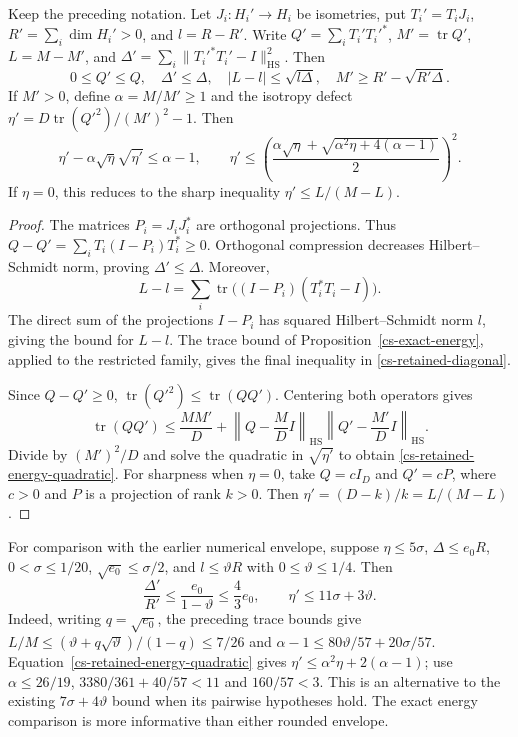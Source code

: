 \begin{proposition}
\label{cs-retained-energy}
Keep the preceding notation. Let $J_i:H_i'\to H_i$ be isometries,
put $T_i'=T_iJ_i$, $R'=\sum_i\dim H_i'>0$, and $l=R-R'$.
Write $Q'=\sum_iT_i'T_i'^*$, $M'=\operatorname{tr}Q'$,
$L=M-M'$, and $\Delta'=\sum_i\|T_i'^*T_i'-I\|_{\mathrm{HS}}^2$.
Then
\begin{equation}\label{cs-retained-diagonal}
 0\le Q'\le Q,\quad
 \Delta'\le\Delta,\quad |L-l|\le\sqrt{l\Delta},\quad
 M'\ge R'-\sqrt{R'\Delta}.
\end{equation}
If $M'>0$, define $\alpha=M/M'\ge1$ and the isotropy defect
$\eta'=D\operatorname{tr}(Q'^2)/(M')^2-1$. Then
\begin{equation}\label{cs-retained-energy-quadratic}
 \eta'-\alpha\sqrt\eta\sqrt{\eta'}\le\alpha-1,
 \qquad
 \eta'\le
 \left(\frac{\alpha\sqrt\eta+
       \sqrt{\alpha^2\eta+4(\alpha-1)}}2\right)^2.
\end{equation}
If $\eta=0$, this reduces to the sharp inequality
$\eta'\le L/(M-L)$.
\end{proposition}
\begin{proof}
The matrices $P_i=J_iJ_i^*$ are orthogonal projections. Thus
$Q-Q'=\sum_iT_i(I-P_i)T_i^*\ge0$.
Orthogonal compression decreases Hilbert--Schmidt norm, proving
$\Delta'\le\Delta$. Moreover,
\[
 L-l=\sum_i\operatorname{tr}\bigl((I-P_i)(T_i^*T_i-I)\bigr).
\]
The direct sum of the projections $I-P_i$ has squared
Hilbert--Schmidt norm $l$, giving the bound for $L-l$.
The trace bound of Proposition~\ref{cs-exact-energy}, applied to
the restricted family, gives the final inequality in
\eqref{cs-retained-diagonal}.

Since $Q-Q'\ge0$,
$\operatorname{tr}(Q'^2)\le\operatorname{tr}(QQ')$.
Centering both operators gives
\[
 \operatorname{tr}(QQ')\le\frac{MM'}D+
 \left\|Q-\frac MD I\right\|_{\mathrm{HS}}
 \left\|Q'-\frac{M'}D I\right\|_{\mathrm{HS}}.
\]
Divide by $(M')^2/D$ and solve the quadratic in
$\sqrt{\eta'}$ to obtain \eqref{cs-retained-energy-quadratic}.
For sharpness when $\eta=0$, take $Q=cI_D$ and $Q'=cP$,
where $c>0$ and $P$ is a projection of rank $k>0$.
Then $\eta'=(D-k)/k=L/(M-L)$.
\end{proof}

For comparison with the earlier numerical envelope, suppose
$\eta\le5\sigma$, $\Delta\le e_0R$,
$0<\sigma\le1/20$, $\sqrt{e_0}\le\sigma/2$, and
$l\le\vartheta R$ with $0\le\vartheta\le1/4$.
Then
\[
 \frac{\Delta'}{R'}\le\frac{e_0}{1-\vartheta}\le\frac43e_0,
 \qquad \eta'\le11\sigma+3\vartheta.
\]
Indeed, writing $q=\sqrt{e_0}$, the preceding trace bounds give
$L/M\le(\vartheta+q\sqrt\vartheta)/(1-q)\le7/26$ and
$\alpha-1\le80\vartheta/57+20\sigma/57$.
Equation~\eqref{cs-retained-energy-quadratic} gives
$\eta'\le\alpha^2\eta+2(\alpha-1)$; use
$\alpha\le26/19$, $3380/361+40/57<11$ and $160/57<3$.
This is an alternative to the existing $7\sigma+4\vartheta$
bound when its pairwise hypotheses hold. The exact energy comparison
is more informative than either rounded envelope.

